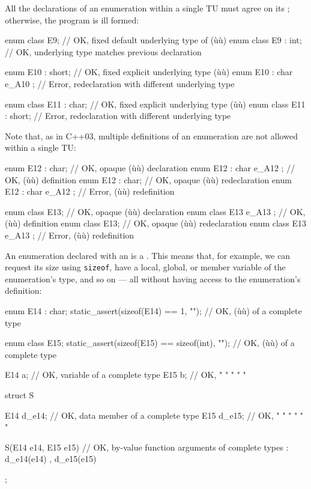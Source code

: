 All the declarations of an enumeration within a single TU must agree on its ; otherwise, the program is ill formed:

\begin{emcppslisting}
enum class E9;              // OK, fixed default underlying type of (ù{}ù)
enum class E9 : int;        // OK, underlying type matches previous declaration

enum E10 : short;           // OK, fixed explicit underlying type (ù{}ù)
enum E10 : char { e_A10 };  // Error, redeclaration with different underlying type

enum class E11 : char;      // OK, fixed explicit underlying type (ù{}ù)
enum class E11 : short;     // Error, redeclaration with different underlying type
\end{emcppslisting}

Note that, as in C++03, multiple definitions of an enumeration are not allowed within a single TU:

\begin{emcppslisting}
enum E12 : char;            // OK, opaque (ù{}ù) declaration
enum E12 : char { e_A12 };  // OK, (ù{}ù) definition
enum E12 : char;            // OK, opaque (ù{}ù) redeclaration
enum E12 : char { e_A12 };  // Error, (ù{}ù) redefinition

enum class E13;             // OK, opaque (ù{}ù) declaration
enum class E13 { e_A13 };   // OK, (ù{}ù) definition
enum class E13;             // OK, opaque (ù{}ù) redeclaration
enum class E13 { e_A13 };   // Error, (ù{}ù) redefinition
\end{emcppslisting}

An enumeration  declared with an  is a .  This means that, for example, we can request its size using \lstinline!sizeof!, have a local, global, or member variable of the enumeration's type, and so on --- all without having access to the enumeration's definition:

\begin{emcppslisting}
enum E14 : char;
static_assert(sizeof(E14) == 1, "");            // OK, (ù{}ù) of a complete type

enum class E15;
static_assert(sizeof(E15) == sizeof(int), "");  // OK, (ù{}ù) of a complete type

E14 a;  // OK, variable of a complete type 
E15 b;  // OK,     "     " "     "      " 

struct S {
    E14 d_e14;  // OK, data member of a complete type
    E15 d_e15;  // OK,   "     "    " "     "      "

    S(E14 e14, E15 e15)  // OK, by-value function arguments of complete types
    : d_e14(e14)
    , d_e15(e15)
    {
    }
};
\end{emcppslisting}

